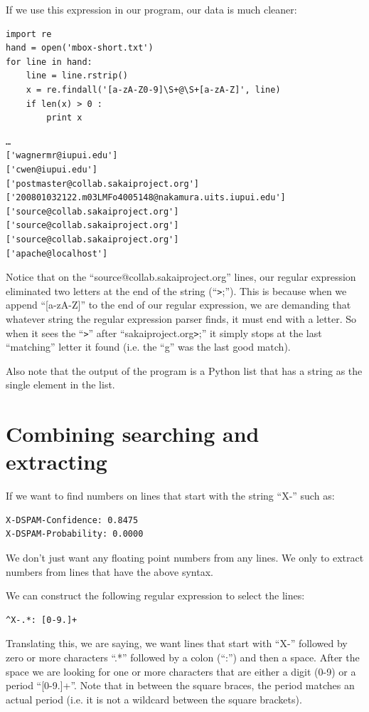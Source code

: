 \documentclass[10pt]{book}
\begin{document}
If we use this expression in our program, our data is much cleaner:

\beforeverb
\begin{verbatim}
import re
hand = open('mbox-short.txt')
for line in hand:
    line = line.rstrip()
    x = re.findall('[a-zA-Z0-9]\S+@\S+[a-zA-Z]', line)
    if len(x) > 0 :
        print x
\end{verbatim}
\afterverb
%
\beforeverb
\begin{verbatim}
…
['wagnermr@iupui.edu']
['cwen@iupui.edu']
['postmaster@collab.sakaiproject.org']
['200801032122.m03LMFo4005148@nakamura.uits.iupui.edu']
['source@collab.sakaiproject.org']
['source@collab.sakaiproject.org']
['source@collab.sakaiproject.org']
['apache@localhost']
\end{verbatim}
\afterverb
%
Notice that on the ``source@collab.sakaiproject.org'' lines, our regular expression eliminated two letters at the end of the string (``\verb">";'').  This is because when we append ``[a-zA-Z]'' to the end of our regular expression, we are demanding that whatever string the regular expression parser finds, it must end with a letter.   So when it sees the ``\verb">"'' after ``sakaiproject.org\verb">";'' it simply stops at the last ``matching'' letter it found (i.e. the ``g'' was the last good match).

Also note that the output of the program is a Python list that has a string as the single element in the list.

\section{Combining searching and extracting}

If we want to find numbers on lines that start with the string ``X-'' such as:

\beforeverb
\begin{verbatim}
X-DSPAM-Confidence: 0.8475
X-DSPAM-Probability: 0.0000  
\end{verbatim}
\afterverb
%
We don't just want any floating point numbers from any lines.  We only to extract numbers from lines that have the above syntax.

We can construct the following regular expression to select the lines:

\beforeverb
\begin{verbatim}
^X-.*: [0-9.]+
\end{verbatim}
\afterverb
%
Translating this, we are saying, we want lines that start with ``X-'' followed by zero or more characters ``.*'' followed by a colon (``:'') and then a space.  After the space we are looking for one or more characters that are either a digit (0-9) or a period ``[0-9.]+''.  Note that in between the square braces, the period matches an actual period (i.e. it is not a wildcard between the square brackets).
\end{document}
